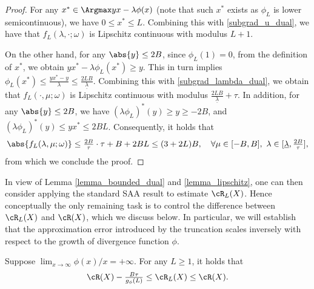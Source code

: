 \documentclass[9pt]{article} %
\numberwithin{equation}{section}
\renewcommand{\frac}[2]{\tfrac{#1}{#2}}
\begin{document}
\begin{proof}
For any $x^* \in \Argmax yx - \lambda \phi(x)$ (note that such $x^*$ exists as $\phi_L$ is lower semicontinuous), we have $0 \leq x^* \leq L$. 
Combining this with \eqref{subgrad_u_dual}, we have that 
$f_L(\lambda, \cdot; \omega)$ is Lipschitz continuous with modulus $L+1$. 

On the other hand, for any $\abs{y} \leq 2B$, since $\phi_L(1) = 0$, from the definition of $x^*$, we obtain  
$y x^* - \lambda \phi_L(x^*) \geq  y $.
This in turn implies 
$
\phi_L(x^*) \leq \frac{y x^* - y }{\lambda} \leq \frac{2 LB }{\underline{\lambda}}.
$ 
Combining this with \eqref{subgrad_lambda_dual}, 
we obtain that $f_L(\cdot, \mu; \omega)$ is Lipschitz continuous with modulus $\frac{2LB}{\underline{\lambda}} + \tau $. 
In addition, for any $\abs{y} \leq 2B$, we have  $(\lambda \phi_L)^*(y) \geq y \geq -2B$, and 
$(\lambda \phi_L)^*(y) \leq y x^* \leq 2B L$.
Consequently, it holds that
\begin{align*}
\abs{f_L(\lambda, \mu; \omega) } \leq \frac{2B}{\tau} \cdot \tau + B + 2B L   \leq (3 + 2L) B,
~~~ 
\forall \mu  \in [-B, B], ~ \lambda \in [\underline{\lambda}, \frac{2B}{\tau}],
\end{align*}
from which we conclude the proof.
\end{proof}


In view of   Lemma \ref{lemma_bounded_dual} and \ref{lemma_lipschitz},  one can then consider applying the standard SAA result to estimate $\cR_L(X)$. 
Hence conceptually the only remaining task is to control the difference between $\cR_L(X)$ and $\cR(X)$, which we discuss below.
In particular, we will establish that the approximation error introduced by the truncation scales inversely with respect to the growth of divergence function $\phi$. 

\begin{lemma}\label{lemma_risk_via_truncation}
Suppose $\lim_{x \to \infty} \phi(x) / x = +\infty$.
For any $L \geq 1$, it holds that 
\begin{align}\label{ineq_truncate_tail_via_growth}
\cR(X) - \frac{B\tau}{g_\phi(L)} \leq \cR_L(X) \leq \cR(X).
\end{align}
\end{lemma}
\end{document}
